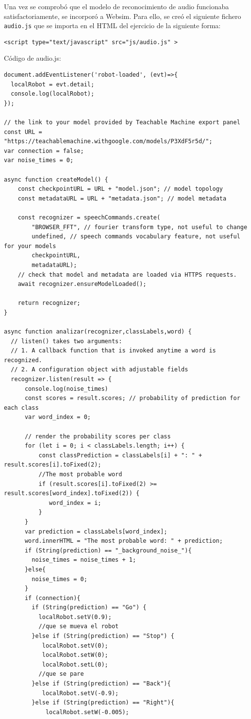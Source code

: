 Una vez se comprobó que el modelo de reconocimiento de audio funcionaba satisfactoriamente, se incorporó a Websim. Para ello, se creó el siguiente fichero \texttt{audio.js} que se importa en el HTML del ejercicio de la siguiente forma:   

\begin{lstlisting}
<script type="text/javascript" src="js/audio.js" >
\end{lstlisting}

Código de audio.js:

\begin{lstlisting}
document.addEventListener('robot-loaded', (evt)=>{
  localRobot = evt.detail;
  console.log(localRobot);
});

// the link to your model provided by Teachable Machine export panel
const URL = "https://teachablemachine.withgoogle.com/models/P3XdF5r5d/";
var connection = false;
var noise_times = 0;

async function createModel() {
    const checkpointURL = URL + "model.json"; // model topology
    const metadataURL = URL + "metadata.json"; // model metadata

    const recognizer = speechCommands.create(
        "BROWSER_FFT", // fourier transform type, not useful to change
        undefined, // speech commands vocabulary feature, not useful for your models
        checkpointURL,
        metadataURL);
    // check that model and metadata are loaded via HTTPS requests.
    await recognizer.ensureModelLoaded();

    return recognizer;
}

async function analizar(recognizer,classLabels,word) {
  // listen() takes two arguments:
  // 1. A callback function that is invoked anytime a word is recognized.
  // 2. A configuration object with adjustable fields
  recognizer.listen(result => {
      console.log(noise_times)
      const scores = result.scores; // probability of prediction for each class
      var word_index = 0;

      // render the probability scores per class
      for (let i = 0; i < classLabels.length; i++) {
          const classPrediction = classLabels[i] + ": " + result.scores[i].toFixed(2);
          //The most probable word
          if (result.scores[i].toFixed(2) >= result.scores[word_index].toFixed(2)) {
             word_index = i;
          }
      }
      var prediction = classLabels[word_index];
      word.innerHTML = "The most probable word: " + prediction;
      if (String(prediction) == "_background_noise_"){
        noise_times = noise_times + 1;
      }else{
        noise_times = 0;
      }
      if (connection){
        if (String(prediction) == "Go") {
          localRobot.setV(0.9);
          //que se mueva el robot
        }else if (String(prediction) == "Stop") {
           localRobot.setV(0);
           localRobot.setW(0);
           localRobot.setL(0);
          //que se pare
        }else if (String(prediction) == "Back"){
           localRobot.setV(-0.9);
        }else if (String(prediction) == "Right"){
            localRobot.setW(-0.005);


\end{lstlisting}
